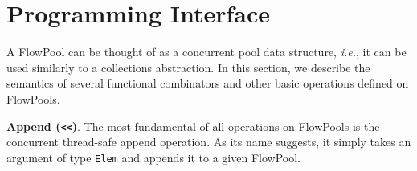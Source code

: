 \documentclass[runningheads,a4paper]{llncs}
\begin{document}



\section{Programming Interface}
\label{sec:programming-interface}

A FlowPool can be thought of as a concurrent pool data structure,
\textit{i.e.}, it can be used similarly to a collections abstraction. In this
section, we describe the semantics of several functional combinators and other
basic operations defined on FlowPools.

\textbf{Append (\texttt{<<})}. The most fundamental of all
operations on FlowPools is the concurrent thread-safe append operation.
As its name suggests, it
simply takes an argument of type \texttt{Elem} and appends it to a given
FlowPool.
 
\end{document}

